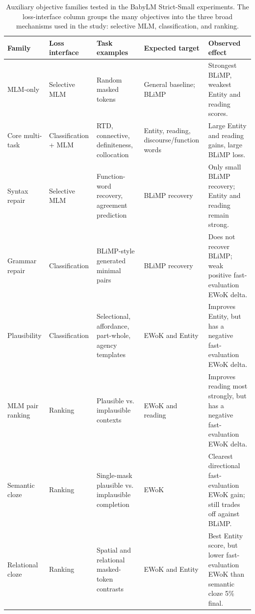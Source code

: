\begin{table}[t]
\centering
\scriptsize
\setlength{\tabcolsep}{3pt}
\begin{tabularx}{\textwidth}{p{}p{}p{}p{}X}
\toprule
\textbf{Family} & \textbf{Loss interface} & \textbf{Task examples} & \textbf{Expected target} & \textbf{Observed effect} \\
\midrule
MLM-only & Selective MLM & Random masked tokens & General baseline; BLiMP & Strongest BLiMP, weakest Entity and reading scores. \\
Core multi-task & Classification + MLM & RTD, connective, definiteness, collocation & Entity, reading, discourse/function words & Large Entity and reading gains, large BLiMP loss. \\
Syntax repair & Selective MLM & Function-word recovery, agreement prediction & BLiMP recovery & Only small BLiMP recovery; Entity and reading remain strong. \\
Grammar repair & Classification & BLiMP-style generated minimal pairs & BLiMP recovery & Does not recover BLiMP; weak positive fast-evaluation EWoK delta. \\
Plausibility & Classification & Selectional, affordance, part-whole, agency templates & EWoK and Entity & Improves Entity, but has a negative fast-evaluation EWoK delta. \\
MLM pair ranking & Ranking & Plausible vs. implausible contexts & EWoK and reading & Improves reading most strongly, but has a negative fast-evaluation EWoK delta. \\
Semantic cloze & Ranking & Single-mask plausible vs. implausible completion & EWoK & Clearest directional fast-evaluation EWoK gain; still trades off against BLiMP. \\
Relational cloze & Ranking & Spatial and relational masked-token contrasts & EWoK and Entity & Best Entity score, but lower fast-evaluation EWoK than semantic cloze 5\% final. \\
\bottomrule
\end{tabularx}
\caption{Auxiliary objective families tested in the BabyLM Strict-Small experiments. The loss-interface column groups the many objectives into the three broad mechanisms used in the study: selective MLM, classification, and ranking.}
\label{tab:objective-families}
\end{table}
